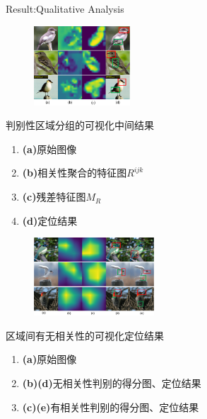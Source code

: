 \begin{frame}{Result:Qualitative Analysis}
    \begin{multicols}{2}
        \begin{figure}
            \centering
            \includegraphics[width=0.32\textwidth]{docs/paperReading/CDL/result-2.png}
        \end{figure}
        \begin{scriptsize}
            判别性区域分组的可视化中间结果
            \begin{enumerate}
                \item \textbf{(a)}原始图像
                \item \textbf{(b)}相关性聚合的特征图$R^{ijk}$
                \item \textbf{(c)}残差特征图$M_R$
                \item \textbf{(d)}定位结果
            \end{enumerate}
        \end{scriptsize}  

        \begin{figure}
            \centering
            \includegraphics[width=0.4\textwidth]{docs/paperReading/CDL/result-3.png}
        \end{figure}
        \begin{scriptsize}
            区域间有无相关性的可视化定位结果
            \begin{enumerate}
                \item \textbf{(a)}原始图像
                \item \textbf{(b)(d)}无相关性判别的得分图、定位结果
                \item \textbf{(c)(e)}有相关性判别的得分图、定位结果
            \end{enumerate}
        \end{scriptsize}
    \end{multicols}
    
    
    
\end{frame}